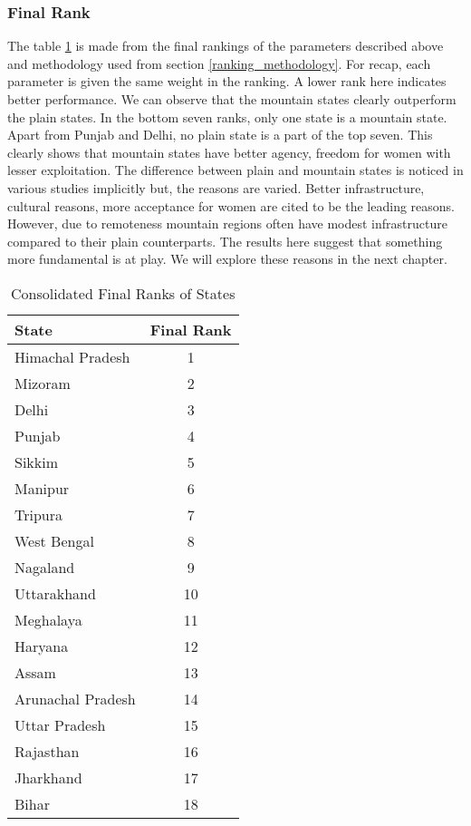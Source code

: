\subsubsection{Final Rank}
 The table \ref{tab:consolidated_ranks} is made from the final rankings of the parameters described above and methodology used from section \ref{ranking_methodology}. For recap, each parameter is given the same weight in the ranking. A lower rank here indicates better performance. We can observe that the mountain states clearly outperform the plain states. In the bottom seven ranks, only one state is a mountain state. Apart from Punjab and Delhi, no plain state is a part of the top seven. This clearly shows that mountain states have better agency, freedom for women with lesser exploitation. The difference between plain and mountain states is noticed in various studies implicitly \citep{kishor2004women} but, the reasons are varied. Better infrastructure, cultural reasons, more acceptance for women are cited to be the leading reasons. However, due to remoteness mountain regions often have modest infrastructure compared to their plain counterparts. The results here suggest that something more fundamental is at play. We will explore these reasons in the next chapter.
\begin{table}[h!]
\centering
\begin{tabular}{|l|c|}
\hline
\textbf{State} & \textbf{Final Rank} \\
\hline
Himachal Pradesh & 1 \\
Mizoram & 2 \\
Delhi & 3 \\
Punjab & 4 \\
Sikkim & 5 \\
Manipur & 6 \\
Tripura & 7 \\
West Bengal & 8 \\
Nagaland & 9 \\
Uttarakhand & 10 \\
Meghalaya & 11 \\
Haryana & 12 \\
Assam & 13 \\
Arunachal Pradesh & 14 \\
Uttar Pradesh & 15 \\
Rajasthan & 16 \\
Jharkhand & 17 \\
Bihar & 18 \\
\hline
\end{tabular}
\caption{Consolidated Final Ranks of States}
\label{tab:consolidated_ranks}
\end{table}
